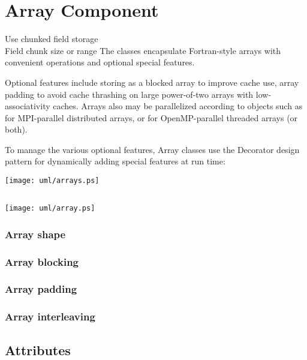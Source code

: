 \section{Array Component} \label{s:component-array}

Use chunked field storage \\
Field chunk size or range
The  classes encapsulate Fortran-style arrays with
convenient operations and optional special features.  

Optional features include storing as a blocked array to improve cache
use, array padding to avoid cache thrashing on large power-of-two
arrays with low-associativity caches.  Arrays also may be parallelized
according to  objects such as
 for MPI-parallel distributed arrays, or
 for OpenMP-parallel threaded arrays (or both).

To manage the various optional features, Array classes use the
Decorator design pattern for dynamically adding special features at
run time:

 \centerline{\texttt{[image: uml/arrays.ps]}}

\subsection{}

\centerline{\texttt{[image: uml/array.ps]}}

\subsubsection{Array shape}

\subsubsection{Array blocking}

\subsubsection{Array padding}

\subsubsection{Array interleaving}


\subsection{Attributes}

